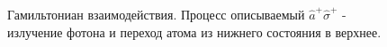 \begin{figure}
\centering



\caption{Гамильтониан взаимодействия. Процесс описываемый $\hat{a}^{+}\hat{\sigma}^{+}$ - излучение
  фотона и переход атома из нижнего состояния в верхнее.}
\label{figPart1Ch2_2_4}
\end{figure}
